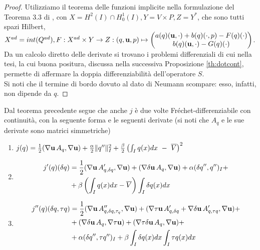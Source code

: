 \begin{proof}
	Utilizziamo il teorema delle funzioni implicite nella formulazione del Teorema 3.3 di \cite{Kinigera}, con $X=H^2(I)\cap H^1_0(I), Y=V\times P, Z=Y^*$, che sono tutti spazi Hilbert, $X^{ad}=int(Q^{ad}), F:X^{ad}\times Y \to Z:(q,\mathbf{u},p)\mapsto
	\begin{pmatrix}
		a(q)(\mathbf{u},\cdot)+b(q)(\cdot,p)-F(q)(\cdot)\\
		b(q)(\mathbf{u},\cdot)-G(q)(\cdot)
	\end{pmatrix}$.\\
	Da un calcolo diretto delle derivate si trovano i problemi differenziali di cui nella tesi, la cui buona positura, discussa nella successiva Proposizione \ref{th:dotcont}, permette di affermare la doppia differenziabilit\`a dell'operatore $S$.\\
Si noti che il termine di bordo dovuto al dato di Neumann scompare: esso, infatti, non dipende da $q$. %
\end{proof}
Dal teorema precedente segue che anche $j$ \`e due volte Fr\'echet-differenziabile con continuit\`a, con la seguente forma e le seguenti derivate (si noti che $A_q$ e le sue derivate sono matrici simmetriche)
\begin{enumerate}
	\item $j(q)=\frac{1}{2}(\nabla\u\, A_q,\nabla\u) + \frac{\alpha}{2}\|q''\|_I^2 + \frac{\beta}{2}\left(\int_Iq(x)dx\ - \ \overline{V}\right)^2$
	\item \begin{equation*}
		\begin{split} 
		j'(q)({\delta q}) &= \frac{1}{2}(\nabla\mathbf{u}\, A'_{q,{\delta q}},\nabla\mathbf{u}) + (\nabla\mathbf{\delta u}\, A_q,\nabla\mathbf{u}) + \alpha({\delta q}'',q'')_I +\\
		&+ \beta\left(\int_I{q(x)dx}-\overline{V}\right)\int_I{{\delta q}(x)dx}
		\end{split}
		\end{equation*}
	\item  \begin{equation*}
		\begin{split}
		j''(q)({\delta q},\tau q) &= \frac{1}{2}(\nabla\mathbf{u}\, A''_{q,{\delta q},\tau_q},\nabla\mathbf{u}) + (\nabla\tau\mathbf{u}\, A'_{q,{\delta q}}+\nabla\mathbf{\delta u}\, A'_{q,\tau q},\nabla\mathbf{u}) +\\
		&+ (\nabla\mathbf{\delta u}\,A_q,\nabla\tau\mathbf{u}) + (\nabla\tau\mathbf{\delta u}\,A_q,\nabla\mathbf{u})+\\
		&+ \alpha({\delta q}'',\tau q'')_I + \beta\int_I{{\delta q}(x)dx}\int_I{\tau q(x)dx}
		\end{split}
		\end{equation*}
\end{enumerate}
